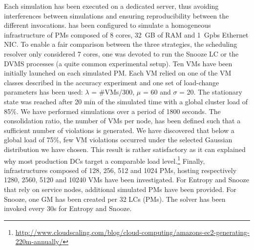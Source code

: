 Each simulation has been executed on a dedicated server, thus
avoiding interferences between simulations and ensuring
reproducibility between the different invocations.
%
\vmps has been configured to simulate a homogeneous infrastructure of
PMs composed of 8 cores, 32~GB of RAM and 1~Gpbs Ethernet NIC. To
enable a fair comparison between the three strategies, the scheduling
resolver only considered 7 cores, \ie one was devoted to run the
Snooze LC or the DVMS processes (a quite common experimental setup).
Ten VMs have been initially launched on each simulated PM. Each VM
relied on one of the VM classes described in the accuracy experiment
and one set of load-change parameters has been used: $\lambda$ =
\#VMs/300, $\mu$ = 60 and $\sigma$ = 20. The stationary state was
reached after 20 min of the simulated time with a global cluster load
of 85\%.
We have performed simulations over a period of 1800 seconds. The
consolidation ratio, \ie the number of VMs per node, has been defined
such that a sufficient number of violations is generated. We have
discovered that below a global load of 75\%, few VM violations occurred
under the selected Gaussian distribution we have chosen. This result
is rather satisfactory as it can explained why most production DCs
target a comparable load
level.\footnote{\url{http://www.cloudscaling.com/blog/cloud-computing/amazons-ec2-generating-220m-annually/}}
Finally, infrastructures composed of 128, 256, 512 and 1024 PMs,
hosting respectively 1280, 2560, 5120 and 10240 VMs have been
investigated. For Entropy and Snooze that rely on service nodes,
additional simulated PMs have been provided. For Snooze, one GM has
been created per 32 LCs (\ie PMs). The solver has been invoked
every 30s for Entropy and Snooze.
